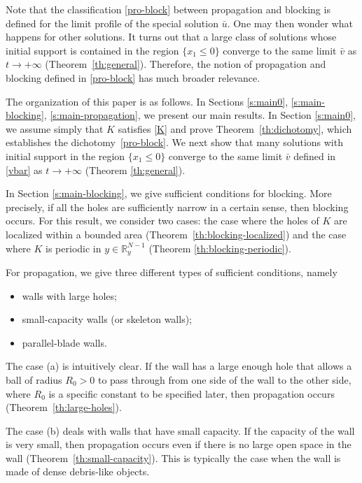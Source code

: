 \documentclass[a4paper,12pt,fullpage]{article}
\numberwithin{equation}{section}
\def\R{{\mathbb R}}
\begin{document}
Note that the classification \eqref{pro-block} between propagation and blocking is defined for the limit profile of the special solution $\bar{u}$. One may then wonder what happens for other solutions. It turns out that a large class of solutions whose initial support is contained in the region $\{x_1\leq 0\}$ converge to the same limit $\bar{v}$ as $t\to+\infty$ (Theorem~\ref{th:general}). Therefore, the notion of propagation and blocking defined in \eqref{pro-block} has much broader relevance.

The organization of this paper is as follows. In Sections \ref{s:main0}, \ref{s:main-blocking}, \ref{s:main-propagation}, we present our main results. In Section \ref{s:main0}, we assume simply that $K$ satisfies \eqref{K} and prove Theorem~\ref{th:dichotomy}, which establishes the dichotomy~\eqref{pro-block}. We next show that many solutions with initial support in the region $\{x_1\leq 0\}$ converge to the same limit $\bar{v}$ defined in \eqref{vbar} as $t\to+\infty$ (Theorem \ref{th:general}).

In Section \ref{s:main-blocking}, we give sufficient conditions for blocking. More precisely, if all the holes are sufficiently narrow in a certain sense, then blocking occurs. For this result, we consider two cases: the case where the holes of $K$ are localized within a bounded area (Theorem~\ref{th:blocking-localized}) and the case where $K$ is periodic in $y\in\R^{N-1}_y$ (Theorem \ref{th:blocking-periodic}). 

For propagation, we give three different types of sufficient conditions, namely
\begin{itemize}
\setlength{\parskip}{0pt}
\setlength{\itemindent}{30pt}
\item[(a)] walls with large holes;
\item[(b)] small-capacity walls (or skeleton walls);
\item[(c)] parallel-blade walls. 
\end{itemize}

The case (a) is intuitively clear. If the wall has a large enough hole that allows a ball of radius $R_0>0$ to pass through from one side of the wall to the other side, where $R_0$ is a specific constant to be specified later, then propagation occurs (Theorem~\ref{th:large-holes}). 

The case (b) deals with walls that have small capacity. If the capacity of the wall is very small, then propagation occurs even if there is no large open space in the wall (Theorem~\ref{th:small-capacity}). This is typically the case when the wall is made of dense debris-like objects.
\end{document}
